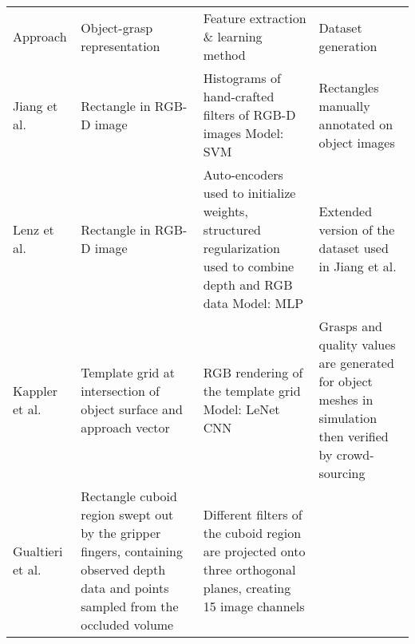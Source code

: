 \begin{table}[h!]
    \small
    \begin{tabularx}{\textwidth}{L{0.12\textwidth}L{0.26\textwidth}L{0.33\textwidth}L{0.26\textwidth}}
    \cmidrule[0.08em](){1-4}
    Approach                              & Object-grasp representation & Feature extraction \& learning method
                                                                        & Dataset generation
    \\ \cmidrule[0.08em](){1-4}
    Jiang et al. \cite{jiang2011}         & Rectangle in RGB-D image
                                          & Histograms of hand-crafted filters of RGB-D images
                                            \linebreak Model: SVM
                                          & Rectangles manually annotated on object images
                                          \\ \cmidrule[0.01em](){1-4}
    Lenz et al. \cite{lenz2015}           & Rectangle in RGB-D image
                                          & Auto-encoders used to initialize weights, structured regularization used
                                            to combine depth and RGB data
                                            \linebreak Model: MLP
                                          & Extended version of the dataset used in Jiang et al. \cite{jiang2011}
                                          \\ \cmidrule[0.01em](){1-4}
    Kappler et al. \cite{Kappler2015}     & Template grid at intersection of object surface and approach vector
                                          & RGB rendering of the template grid
                                            \linebreak Model: LeNet CNN
                                          & Grasps and quality values are generated for object meshes in simulation
                                            then verified by crowd- sourcing
                                          \\ \cmidrule[0.01em](){1-4}
    Gualtieri et al. \cite{Gualtieri2016} & Rectangle cuboid region swept out by the gripper fingers, containing
                                            observed depth data and points sampled from the occluded volume
                                          & Different filters of the cuboid region are projected onto three orthogonal
                                            planes, creating 15 image channels

\end{tabularx}
\end{table}
